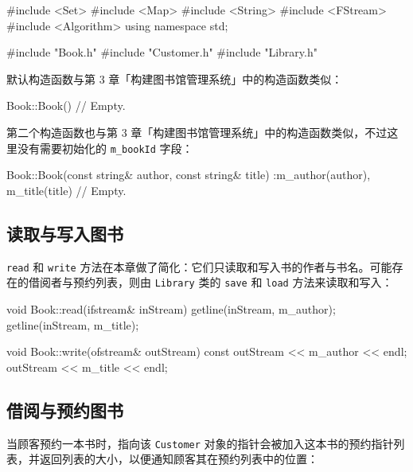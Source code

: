 \begin{codebox}
    list<Customer*> m_reservationPtrList;
};
\end{codebox}

\medskip{}

\begin{codebox}
#include <Set>
#include <Map>
#include <String>
#include <FStream>
#include <Algorithm>
using namespace std;

#include "Book.h"
#include "Customer.h"
#include "Library.h"
\end{codebox}

默认构造函数与第 3 章「构建图书馆管理系统」中的构造函数类似：

\begin{codebox}
Book::Book() {
  // Empty.
}
\end{codebox}

第二个构造函数也与第 3 章「构建图书馆管理系统」中的构造函数类似，不过这里没有需要初始化的 \texttt{m\_bookId} 字段：

\begin{codebox}
Book::Book(const string& author, const string& title)
  :m_author(author),
   m_title(title) {
  // Empty.
}
\end{codebox}

\subsection{读取与写入图书}

\texttt{read} 和 \texttt{write} 方法在本章做了简化：它们只读取和写入书的作者与书名。可能存在的借阅者与预约列表，则由 \texttt{Library} 类的 \texttt{save} 和 \texttt{load} 方法来读取和写入：

\begin{codebox}
void Book::read(ifstream& inStream) {
  getline(inStream, m_author);
  getline(inStream, m_title);
}
\end{codebox}

\begin{codebox}
void Book::write(ofstream& outStream) const {
  outStream << m_author << endl;
  outStream << m_title << endl;
}
\end{codebox}

\subsection{借阅与预约图书}

当顾客预约一本书时，指向该 \texttt{Customer} 对象的指针会被加入这本书的预约指针列表，并返回列表的大小，以便通知顾客其在预约列表中的位置：

